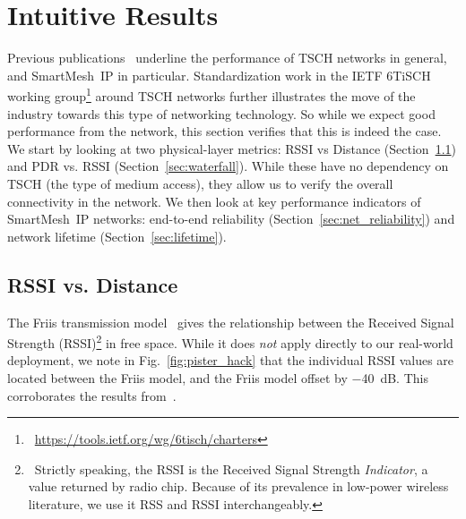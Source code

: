 \documentclass{elsarticle}
\newcommand{\smip}                {SmartMesh~IP\xspace}
\begin{document}
\section{Intuitive Results}
\label{sec:intuitive}

Previous publications~\cite{watteyne16peach,watteyne10mitigating,watteyne09reliability,watteyne15industrial} underline the performance of TSCH networks in general, and \smip in particular.
Standardization work in the IETF 6TiSCH working group\footnote{~\url{https://tools.ietf.org/wg/6tisch/charters}} around TSCH networks further illustrates the move of the industry towards this type of networking technology.
So while we expect good performance from the network, this section verifies that this is indeed the case.
We start by looking at two physical-layer metrics: RSSI vs Distance (Section~\ref{sec:rssi_distance}) and PDR vs. RSSI (Section~\ref{sec:waterfall}).
While these have no dependency on TSCH (the type of medium access), they allow us to verify the overall connectivity in the network.
We then look at key performance indicators of \smip networks: end-to-end reliability (Section~\ref{sec:net_reliability}) and network lifetime (Section~\ref{sec:lifetime}).

\subsection{RSSI vs. Distance}
\label{sec:rssi_distance}

The Friis transmission model~\cite{saunders07antennas} gives the relationship between the Received Signal Strength (RSSI)\footnote{~Strictly speaking, the RSSI is the Received Signal Strength \textit{Indicator}, a value returned by radio chip. Because of its prevalence in low-power wireless literature, we use it RSS and RSSI interchangeably.} in free space.
While it does \textit{not} apply directly to our real-world deployment, we note in Fig.~\ref{fig:pister_hack} that the individual RSSI values are located between the Friis model, and the Friis model offset by $-$40~dB.
This corroborates the results from~\cite{zats10wireless}.
\end{document}
